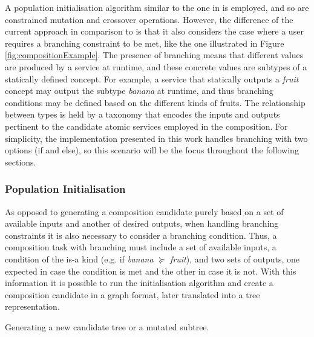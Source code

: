 A population initialisation algorithm similar to the one in \cite{wang2013genetic} is employed, and so are constrained mutation and crossover operations. However, the difference of the current approach in comparison to \cite{wang2013genetic} is that it also considers the case where a user requires a branching constraint to be met, like the one illustrated in Figure \ref{fig:compositionExample}. The presence of branching means that different values are produced by a service at runtime, and these concrete values are subtypes of a statically defined concept. For example, a service that statically outputs a \textit{fruit} concept may output the subtype \textit{banana} at runtime, and thus branching conditions may be defined based on the different kinds of fruits. The relationship between types is held by a taxonomy that encodes the inputs and outputs pertinent to the candidate atomic services employed in the composition. For simplicity, the implementation presented in this work handles branching with two options (if and else), so this scenario will be the focus throughout the following sections.

\subsubsection{Population Initialisation}\label{init}
As opposed to generating a composition candidate purely based on a set of available inputs and another of desired outputs, when handling branching constraints it is also necessary to consider a branching condition. Thus, a composition task with branching must include a set of available inputs, a condition of the is-a kind (e.g. if \textit{banana} $\succeq$ \textit{fruit}), and two sets of outputs, one expected in case the condition is met and the other in case it is not. With this information it is possible to run the initialisation algorithm and create a composition candidate in a graph format, later translated into a tree representation.

\begin{algorithm}
 \setlength{}
 \LinesNumbered
 \SetNlSty{}{}{:}
 \vspace{2mm}
 \caption{\footnotesize Generating a new candidate tree or a mutated subtree.}
\label{generation}
\end{algorithm}

